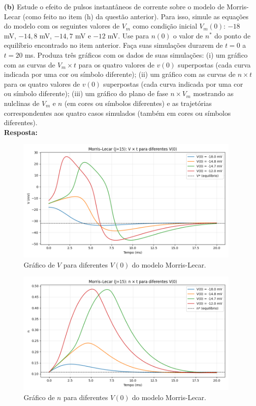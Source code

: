 \documentclass[english,11pt,a4paper]{article}
\begin{document}
	
	\noindent\textbf{(b)} Estude o efeito de pulsos instantâneos de corrente sobre o modelo de Morris-Lecar (como feito no item (h) da questão anterior). Para isso, simule as equações do modelo com os seguintes valores de $V_m$ como condição inicial $V_m(0)$: $-18$ mV, $-14{,}8$ mV, $-14{,}7$ mV e $-12$ mV. Use para $n(0)$ o valor de $n^*$ do ponto de equilíbrio encontrado no item anterior. Faça suas simulações durarem de $t = 0$ a $t = 20$ ms. Produza três gráficos com os dados de suas simulações: (i) um gráfico com as curvas de $V_m \times t$ para os quatro valores de $v(0)$ superpostas (cada curva indicada por uma cor ou símbolo diferente); (ii) um gráfico com as curvas de $n \times t$ para os quatro valores de $v(0)$ superpostas (cada curva indicada por uma cor ou símbolo diferente); (iii) um gráfico do plano de fase $n \times V_m$ mostrando as nulclinas de $V_m$ e $n$ (em cores ou símbolos diferentes) e as trajetórias correspondentes aos quatro casos simulados (também em cores ou símbolos diferentes).\\
	
	\noindent\textbf{Resposta:}
	
	\begin{figure}[H]
		\centering
		\includegraphics[width=11cm]{../figures/ex_2b_1.png}
		\caption{Gráfico de $V$ para diferentes $V(0)$ do modelo Morris-Lecar.}
	\end{figure}
	
	\begin{figure}[H]
		\centering
		\includegraphics[width=11cm]{../figures/ex_2b_2.png}
		\caption{Gráfico de $n$ para diferentes $V(0)$ do modelo Morris-Lecar.}
	\end{figure}
	
\end{document}
